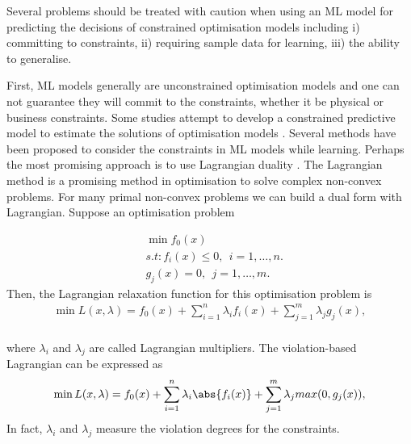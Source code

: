 \documentclass[graybox]{svmult}
\begin{document}
Several problems should be treated with caution when using an ML model for predicting the decisions of constrained optimisation models including i) committing to constraints, ii) requiring sample data for learning, iii) the ability to generalise.

First, ML models generally are unconstrained optimisation models and one can not guarantee they will commit to the constraints, whether it be physical or business constraints. Some studies attempt to develop a constrained predictive model to estimate the solutions of optimisation models \cite{chatzos2020high}. Several methods have been proposed to consider the constraints in ML models while learning. Perhaps the most promising approach is to use Lagrangian duality \cite{Fioretto:ECML20}. The Lagrangian method is a promising method in optimisation to solve complex non-convex problems. For many primal non-convex problems we can build a  dual form with Lagrangian. Suppose an optimisation problem


\begin{align}
& \min_{}f_0(x)\\\nonumber
& s.t: f_i(x) \leq  0, ~~ i = 1, \ldots, n.\\\nonumber
& g_j(x)=0, ~~ j = 1, \ldots, m.
\end{align}\label{primal}
Then, the Lagrangian relaxation function for this optimisation problem is 
\begin{align}
\min L(x,\lambda) = f_0(x) + \sum_{i=1}^{n} \lambda_i f_i(x) + \sum_{j=1}^{m}  \lambda_j g_j(x) , \\\nonumber
\end{align}\label{lagrangian}

where $\lambda_i$ and $\lambda_j$ are called Lagrangian multipliers. The violation-based Lagrangian can be expressed as 
\begin{align}
\min L(x,\lambda) = f_0(x) + \sum_{i=1}^{n}  \lambda_i \abs {f_i(x)} + \sum_{j=1}^{m}   \lambda_j max(0,g_j(x)) , 
\end{align}\label{lagrangian}
In fact, $\lambda_i$ and $\lambda_j$ measure the violation degrees for the constraints. 
\end{document}
